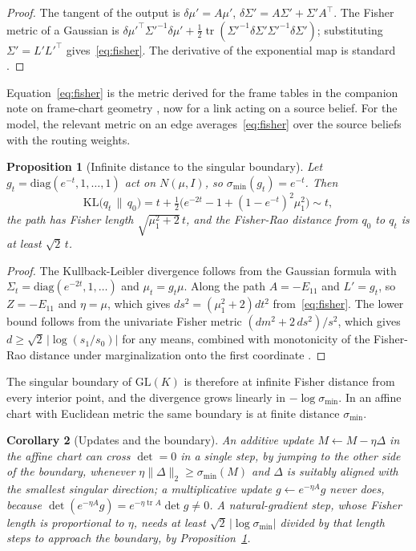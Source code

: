 \documentclass[11pt]{article}
\newtheorem{proposition}{Proposition}
\newtheorem{corollary}[proposition]{Corollary}
\theoremstyle{definition}
\theoremstyle{remark}
\newcommand{\GL}{\mathrm{GL}}
\newcommand{\tr}{\operatorname{tr}}
\begin{document}
\begin{proof}
The tangent of the output is $\delta\mu'=A\mu'$, $\delta\Sigma'=A\Sigma'+\Sigma'A^\top$. The Fisher metric of a Gaussian is $\delta\mu'^\top\Sigma'^{-1}\delta\mu'+\tfrac12\tr(\Sigma'^{-1}\delta\Sigma'\Sigma'^{-1}\delta\Sigma')$; substituting $\Sigma'=L'L'^\top$ gives~\eqref{eq:fisher}. The derivative of the exponential map is standard \cite{hall2015}.
\end{proof}

Equation~\eqref{eq:fisher} is the metric derived for the frame tables in the companion note on frame-chart geometry \cite{dennis2026phinatgrad}, now for a link acting on a source belief. For the model, the relevant metric on an edge averages~\eqref{eq:fisher} over the source beliefs with the routing weights.

\begin{proposition}[Infinite distance to the singular boundary]
\label{prop:barrier}
Let $g_t=\mathrm{diag}(e^{-t},1,\dots,1)$ act on $N(\mu,I)$, so $\sigma_{\min}(g_t)=e^{-t}$. Then
\begin{equation}
\mathrm{KL}\big(q_t\,\|\,q_0\big)=t+\tfrac12\big(e^{-2t}-1+(1-e^{-t})^2\mu_1^2\big)\sim t,
\label{eq:klbarrier}
\end{equation}
the path has Fisher length $\sqrt{\mu_1^2+2}\,t$, and the Fisher-Rao distance from $q_0$ to $q_t$ is at least $\sqrt2\,t$.
\end{proposition}

\begin{proof}
The Kullback-Leibler divergence follows from the Gaussian formula with $\Sigma_t=\mathrm{diag}(e^{-2t},1,\dots)$ and $\mu_t=g_t\mu$. Along the path $A=-E_{11}$ and $L'=g_t$, so $Z=-E_{11}$ and $\eta=\mu$, which gives $ds^2=(\mu_1^2+2)dt^2$ from~\eqref{eq:fisher}. The lower bound follows from the univariate Fisher metric $(dm^2+2\,d s^2)/s^2$, which gives $d\ge\sqrt2\,|\log(s_1/s_0)|$ for any means, combined with monotonicity of the Fisher-Rao distance under marginalization onto the first coordinate \cite{amari2000}.
\end{proof}

The singular boundary of $\GL(K)$ is therefore at infinite Fisher distance from every interior point, and the divergence grows linearly in $-\log\sigma_{\min}$. In an affine chart with Euclidean metric the same boundary is at finite distance $\sigma_{\min}$.

\begin{corollary}[Updates and the boundary]
\label{cor:updates}
An additive update $M\leftarrow M-\eta\Delta$ in the affine chart can cross $\det=0$ in a single step, by jumping to the other side of the boundary, whenever $\eta\|\Delta\|_2\ge\sigma_{\min}(M)$ and $\Delta$ is suitably aligned with the smallest singular direction; a multiplicative update $g\leftarrow e^{-\eta A}g$ never does, because $\det(e^{-\eta A}g)=e^{-\eta\tr A}\det g\ne0$. A natural-gradient step, whose Fisher length is proportional to $\eta$, needs at least $\sqrt2\,|\log\sigma_{\min}|$ divided by that length steps to approach the boundary, by Proposition~\ref{prop:barrier}.
\end{corollary}
\end{document}
